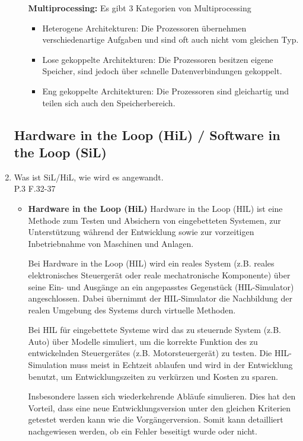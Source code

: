 \documentclass[10pt,a4paper,fleqn]{article}
\begin{document}
\begin{enumerate}
\begin{itemize}
				\textbf{Multiprocessing:} Es gibt 3 Kategorien von Multiprocessing		
					\begin{itemize}
						\item Heterogene Architekturen: Die Prozessoren übernehmen verschiedenartige Aufgaben und sind oft auch nicht vom gleichen Typ.
						\item Lose gekoppelte Architekturen: Die Prozessoren besitzen eigene Speicher, sind jedoch über schnelle Datenverbindungen gekoppelt.
						\item Eng gekoppelte Architekturen: Die Prozessoren sind gleichartig und teilen sich auch den Speicherbereich.
					\end{itemize}
		 \end{itemize}
\subsection{Hardware in the Loop (HiL) / Software in the Loop (SiL)}
	\item Was ist SiL/HiL, wie wird es angewandt.\\
		P.3 F.32-37
		\begin{itemize}
			\item \textbf{Hardware in the Loop (HiL)}
				Hardware in the Loop (HIL) ist eine Methode zum Testen und Absichern von eingebetteten Systemen, zur Unterstützung während der Entwicklung sowie zur vorzeitigen Inbetriebnahme von Maschinen und Anlagen.

				Bei Hardware in the Loop (HIL) wird ein reales System (z.B. reales elektronisches Steuergerät oder reale mechatronische Komponente) über seine Ein- und Ausgänge an ein angepasstes Gegenstück (HIL-Simulator) angeschlossen. Dabei übernimmt der HIL-Simulator die Nachbildung der realen Umgebung des Systems durch virtuelle Methoden.
				
				Bei HIL für eingebettete Systeme wird das zu steuernde System (z.B. Auto) über Modelle simuliert, um die korrekte Funktion des zu entwickelnden Steuergerätes (z.B. Motorsteuergerät) zu testen. Die HIL-Simulation muss meist in Echtzeit ablaufen und wird in der Entwicklung benutzt, um Entwicklungszeiten zu verkürzen und Kosten zu sparen.
				
				Insbesondere lassen sich wiederkehrende Abläufe simulieren. Dies hat den Vorteil, dass eine neue Entwicklungsversion unter den gleichen Kriterien getestet werden kann wie die Vorgängerversion. Somit kann detailliert nachgewiesen werden, ob ein Fehler beseitigt wurde oder nicht.
				

\end{itemize}
\end{enumerate}
\end{document}
